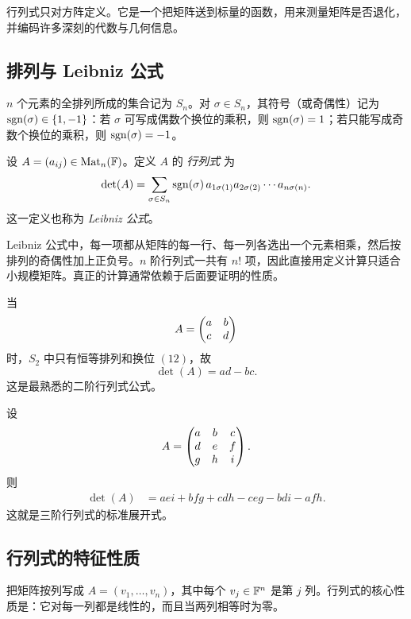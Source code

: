 行列式只对方阵定义。它是一个把矩阵送到标量的函数，用来测量矩阵是否退化，并编码许多深刻的代数与几何信息。

\subsection{排列与 Leibniz 公式}

\begin{definition}
$n$ 个元素的全排列所成的集合记为 $S_n$。对 $\sigma\in S_n$，其符号（或奇偶性）记为 $\operatorname{sgn}(\sigma)\in\{1,-1\}$：若 $\sigma$ 可写成偶数个换位的乘积，则 $\operatorname{sgn}(\sigma)=1$；若只能写成奇数个换位的乘积，则 $\operatorname{sgn}(\sigma)=-1$。
\end{definition}

\begin{definition}[行列式]
设 $A=(a_{ij})\in\mathrm{Mat}_n(\mathbb{F})$。定义 $A$ 的 \emph{行列式} 为
\[
\det(A)=\sum_{\sigma\in S_n}\operatorname{sgn}(\sigma)\,a_{1\sigma(1)}a_{2\sigma(2)}\cdots a_{n\sigma(n)}.
\]
这一定义也称为 \emph{Leibniz 公式}。
\end{definition}

\begin{remark}
Leibniz 公式中，每一项都从矩阵的每一行、每一列各选出一个元素相乘，然后按排列的奇偶性加上正负号。$n$ 阶行列式一共有 $n!$ 项，因此直接用定义计算只适合小规模矩阵。真正的计算通常依赖于后面要证明的性质。
\end{remark}

\begin{example}
当
\[
A=\begin{pmatrix} a&b\\c&d \end{pmatrix}
\]
时，$S_2$ 中只有恒等排列和换位 $(12)$，故
\[
\det(A)=ad-bc.
\]
这是最熟悉的二阶行列式公式。
\end{example}

\begin{example}
设
\[
A=\begin{pmatrix} a&b&c\\d&e&f\\g&h&i \end{pmatrix}.
\]
则
\begin{align*}
\det(A)
&=aei+bfg+cdh-ceg-bdi-afh.
\end{align*}
这就是三阶行列式的标准展开式。
\end{example}

\subsection{行列式的特征性质}

把矩阵按列写成 $A=(v_1,\dots,v_n)$，其中每个 $v_j\in\mathbb{F}^n$ 是第 $j$ 列。行列式的核心性质是：它对每一列都是线性的，而且当两列相等时为零。

